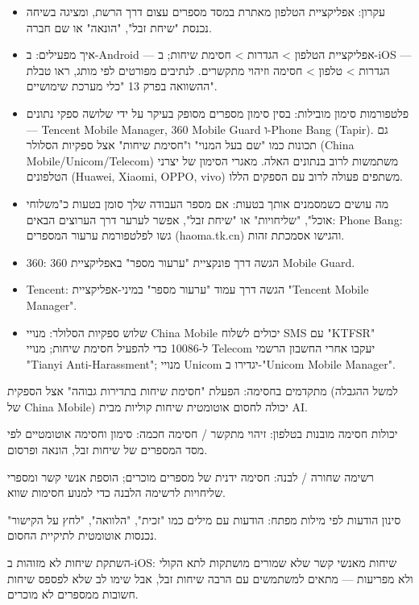 
\begin{itemize}
  \item עקרון: אפליקציית הטלפון מאתרת במסד מספרים עצום דרך הרשת, ומציגה בשיחה נכנסת "שיחת זבל", "הונאה" או שם חברה.
  \item איך מפעילים: ב-Android — אפליקציית הטלפון > הגדרות > חסימת שיחות; ב-iOS — הגדרות > טלפון > חסימה וזיהוי מתקשרים. לנתיבים מפורטים לפי מותג, ראו טבלת ההשוואה בפרק 13 "כלי מערכת שימושיים".
  \item פלטפורמות סימון מובילות: בסין סימון מספרים מסופק בעיקר על ידי שלושה ספקי נתונים — Tencent Mobile Manager, 360 Mobile Guard ו-Phone Bang (Tapir). גם תכונות כמו "שם בעל המנוי" ו"חסימת שיחות" אצל ספקיות הסלולר (China Mobile/Unicom/Telecom) משתמשות לרוב בנתונים האלה. מאגרי הסימון של יצרני הטלפונים (Huawei, Xiaomi, OPPO, vivo) משתפים פעולה לרוב עם הספקים הללו.
  \item מה עושים כשמסמנים אותך בטעות: אם מספר העבודה שלך סומן בטעות כ"משלוחי אוכל", "שליחויות" או "שיחת זבל", אפשר לערער דרך הערוצים הבאים: Phone Bang: גשו לפלטפורמת ערעור המספרים (haoma.tk.cn) והגישו אסמכתת זהות.
  \item 360: הגשה דרך פונקציית "ערעור מספר" באפליקציית 360 Mobile Guard.
  \item Tencent: הגשה דרך עמוד "ערעור מספר" במיני-אפליקציית "Tencent Mobile Manager".
  \item שלוש ספקיות הסלולר: מנויי China Mobile יכולים לשלוח SMS עם "KTFSR" ל-10086 כדי להפעיל חסימת שיחות; מנויי Telecom יעקבו אחרי החשבון הרשמי "Tianyi Anti-Harassment"; מנויי Unicom יגדירו ב-"Unicom Mobile Manager".
\end{itemize}

מתקדמים בחסימה: הפעלת "חסימת שיחות בתדירות גבוהה" אצל הספקית (למשל ההגבלה של China Mobile) יכולה לחסום אוטומטית שיחות קוליות מבית AI.

יכולות חסימה מובנות בטלפון: זיהוי מתקשר / חסימה חכמה: סימון וחסימה אוטומטיים לפי מסד המספרים של שיחות זבל, הונאה ופרסום.

רשימה שחורה / לבנה: חסימה ידנית של מספרים מוכרים; הוספת אנשי קשר ומספרי שליחויות לרשימה הלבנה כדי למנוע חסימות שווא.

סינון הודעות לפי מילות מפתח: הודעות עם מילים כמו "זכית", "הלוואה", "לחץ על הקישור" נכנסות אוטומטית לתיקיית החסום.

השתקת שיחות לא מזוהות ב-iOS: שיחות מאנשי קשר שלא שמורים מושתקות לתא הקולי ולא מפריעות — מתאים למשתמשים עם הרבה שיחות זבל, אבל שימו לב שלא לפספס שיחות חשובות ממספרים לא מוכרים.

